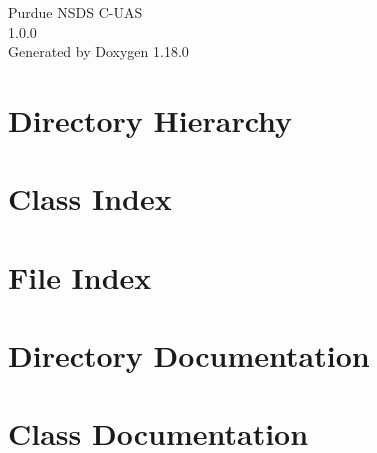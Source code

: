\documentclass[twoside]{book}
\newcommand{\+}{\discretionary{\mbox{\scriptsize$\hookleftarrow$}}{}{}}
\newcommand{\clearemptydoublepage}{%
    \newpage{\pagestyle{empty}\cleardoublepage}%
  }
\begin{document}
  \raggedbottom
    \hypersetup{pageanchor=false,
                bookmarksnumbered=true,
                pdfencoding=unicode
               }
  \begin{titlepage}
  \vspace*{7cm}
  \begin{center}%
  {\Large Purdue NSDS C-\/\+UAS}\\
  [1ex]\large 1.\+0.\+0 \\
  \vspace*{1cm}
  {\large Generated by Doxygen 1.18.0}\\
  \end{center}
  \end{titlepage}
  \clearemptydoublepage
  \tableofcontents
  \clearemptydoublepage
  \hypersetup{pageanchor=true}
\chapter{Directory Hierarchy}

\chapter{Class Index}

\chapter{File Index}

\chapter{Directory Documentation}

\chapter{Class Documentation}














\end{document}

